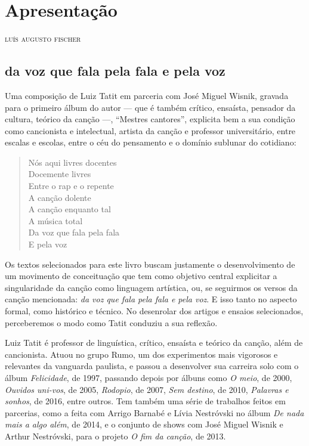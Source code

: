 \chapter{Apresentação}

\begin{flushright}
\textsc{luís augusto fischer}
\end{flushright}

\section{da voz que fala pela fala e pela voz}

\noindent{}Uma composição de Luiz Tatit em parceria com José Miguel Wisnik, gravada para o
primeiro álbum do autor --- que é também crítico, ensaísta, pensador da
cultura, teórico da canção ---, ``Mestres cantores'', explicita bem a sua
condição como cancionista e intelectual, artista da canção e professor
universitário, entre escalas e escolas, entre o céu do pensamento e o
domínio sublunar do cotidiano:

\begin{verse}
\small{Nós aqui livres docentes\\
Docemente livres\\
Entre o rap e o repente\\
A canção dolente\\
A canção enquanto tal\\
A música total\\
Da voz que fala pela fala\\
E pela voz}
\end{verse}

Os textos selecionados para este livro buscam justamente o desenvolvimento de um movimento de conceituação que tem como objetivo central explicitar a singularidade da canção como
linguagem artística, ou, se seguirmos os versos da canção mencionada:
\textit{da voz que fala pela fala e pela voz}. E isso tanto no aspecto
formal, como histórico e técnico. No desenrolar dos artigos e ensaios
selecionados, perceberemos o modo como Tatit conduziu a sua
reflexão.

Luiz Tatit é professor de linguística, crítico, ensaísta e teórico da
canção, além de cancionista. Atuou no grupo
Rumo, um dos experimentos mais vigorosos e relevantes da vanguarda
paulista, e passou a desenvolver sua carreira solo com o álbum
\textit{Felicidade}, de 1997, passando depois por álbuns como \textit{O meio}, de 2000,
\textit{Ouvidos uni-vos}, de 2005, \textit{Rodopio}, de 2007, \textit{Sem destino}, de 2010,
\textit{Palavras e sonhos}, de 2016, entre outros. Tem também uma série de
trabalhos feitos em parcerias, como a feita com Arrigo Barnabé e Lívia
Nestróvski no álbum \textit{De nada mais a algo além}, de 2014, e o conjunto de shows com
José Miguel Wisnik e Arthur Nestróvski, para o projeto \textit{O fim da canção}, de 2013.

